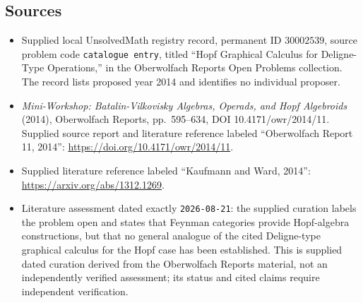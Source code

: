 \documentclass[11pt]{article}
\begin{document}
\subsection{Sources}
\begin{itemize}
\item Supplied local UnsolvedMath registry record, permanent ID \(30002539\), source problem code \texttt{catalogue entry}, titled ``Hopf Graphical Calculus for Deligne-Type Operations,'' in the Oberwolfach Reports Open Problems collection. The record lists proposed year 2014 and identifies no individual proposer.
\item \emph{Mini-Workshop: Batalin-Vilkovisky Algebras, Operads, and Hopf Algebroids} (2014), Oberwolfach Reports, pp.~595--634, DOI 10.4171/owr/2014/11. Supplied source report and literature reference labeled ``Oberwolfach Report 11, 2014'': \url{https://doi.org/10.4171/owr/2014/11}.
\item Supplied literature reference labeled ``Kaufmann and Ward, 2014'': \url{https://arxiv.org/abs/1312.1269}.
\item Literature assessment dated exactly \texttt{2026-08-21}: the supplied curation labels the problem open and states that Feynman categories provide Hopf-algebra constructions, but that no general analogue of the cited Deligne-type graphical calculus for the Hopf case has been established. This is supplied dated curation derived from the Oberwolfach Reports material, not an independently verified assessment; its status and cited claims require independent verification.
\end{itemize}
\end{document}
